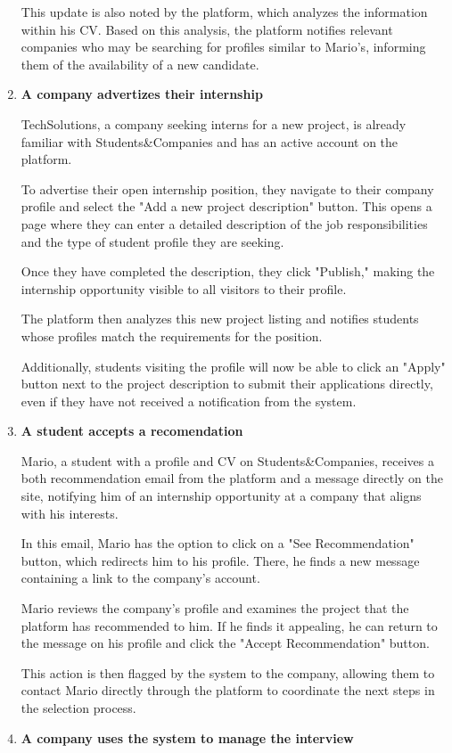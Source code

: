 \begin{enumerate}
    This update is also noted by the platform, which analyzes the information within his CV. Based on this analysis, the platform notifies relevant companies who may be searching for profiles similar to Mario's, informing them of the availability of a new candidate.
    \item \textbf{A company advertizes their internship}
    
    TechSolutions, a company seeking interns for a new project, is already familiar with Students\&Companies and has an active account on the platform.
    
    To advertise their open internship position, they navigate to their company profile and select the "Add a new project description" button. This opens a page where they can enter a detailed description of the job responsibilities and the type of student profile they are seeking. 
    
    Once they have completed the description, they click "Publish," making the internship opportunity visible to all visitors to their profile.

    The platform then analyzes this new project listing and notifies students whose profiles match the requirements for the position. 
    
    
    Additionally, students visiting the profile will now be able to click an "Apply" button next to the project description to submit their applications directly, even if they have not received a notification from the system.
    \item \textbf{A student accepts a recomendation}

    Mario, a student with a profile and CV on Students\&Companies, receives a both recommendation email from the platform and a message directly on the site, notifying him of an internship opportunity at a company that aligns with his interests.
   
    In this email, Mario has the option to click on a "See Recommendation" button, which redirects him to his profile. There, he finds a new message containing a link to the company’s account.

    Mario reviews the company’s profile and examines the project that the platform has recommended to him. If he finds it appealing, he can return to the message on his profile and click the "Accept Recommendation" button.

    This action is then flagged by the system to the company, allowing them to contact Mario directly through the platform to coordinate the next steps in the selection process.
    \item \textbf{A company uses the system to manage the interview}


\end{enumerate}
